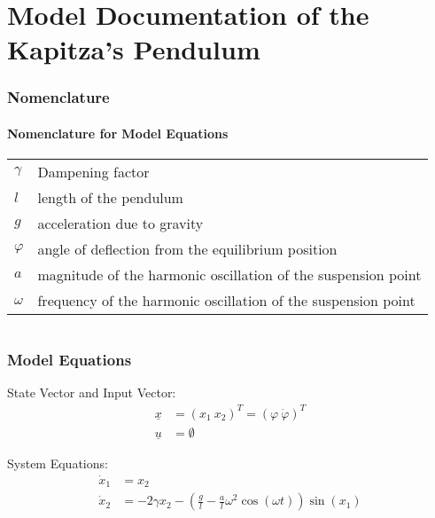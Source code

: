 \documentclass[10pt,a4paper]{article}
\begin{document}
	\part*{Model Documentation of the \\ Kapitza's Pendulum} %
	
	
	\section{Nomenclature} %
	\subsection{Nomenclature for Model Equations} %
	
	\begin{tabular}{ll}
		$\gamma$ & Dampening factor \\
		$l$ & length of the pendulum \\
		$g$ & acceleration due to gravity \\
		$\varphi$ & angle of deflection from the equilibrium position \\
		$a$ & magnitude of the harmonic oscillation of the suspension point \\
		$\omega$ & frequency of the harmonic oscillation of the suspension point
				
	\end{tabular}
	 
	
	\begin{tabular}{ll}

	\end{tabular}
	
	
	\section{Model Equations} %
	
	State Vector and Input Vector:
	\begin{align*}
		\underline{x} &= (x_1 \ x_2)^T = (\varphi \ \dot{\varphi})^T \\
		\underline{u} &= \emptyset
	\end{align*}
	
	\noindent System Equations:			
	\begin{subequations}
	\begin{align}
		\dot{x}_1 &= x_2 \\
		\dot{x}_2 &= -2\gamma x_2 - \left(\frac{g}{l} - \frac{a}{l}\omega^2\cos(\omega t)\right)\sin(x_1)
	\end{align}
	\end{subequations}
\end{document}
